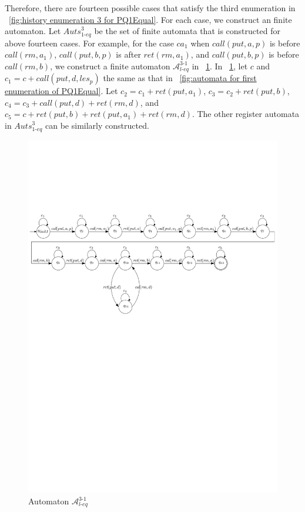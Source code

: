 Therefore, there are fourteen possible cases that satisfy the third enumeration in \figurename~\ref{fig:history enumeration 3 for PQ1Equal}. For each case, we construct an finite automaton. Let $\textit{Auts}_{\textit{1-eq}}^{3}$ be the set of finite automata that is constructed for above fourteen cases. For example, for the case $\textit{ca}_1$ when $\textit{call}(\textit{put},a,p)$ is before $\textit{call}(\textit{rm},a_1)$, $\textit{call}(\textit{put},b,p)$ is after $\textit{ret}(\textit{rm},a_1)$, and $\textit{call}(\textit{put},b,p)$ is before $\textit{call}(\textit{rm},b)$, we construct a finite automaton $\mathcal{A}_{\textit{l-eq}}^{\textit{3-1}}$ in \figurename~\ref{fig:automata for ca1 of third enumeration of Rpr2}. In \figurename~\ref{fig:automata for ca1 of third enumeration of Rpr2}, let $c$ and $c_1 = c + \textit{call}(\textit{put},d,\textit{les}_p)$ the same as that in \figurename~\ref{fig:automata for first enumeration of PQ1Equal}. Let $c_2 = c_1 + \textit{ret}(\textit{put},a_1)$, $c_3 = c_2 + \textit{ret}(\textit{put},b)$, $c_4 = c_3 + \textit{call}(\textit{put},d) + \textit{ret}(\textit{rm},d)$, and $c_5 = c + \textit{ret}(\textit{put},b) + \textit{ret}(\textit{put},a_1) + \textit{ret}(\textit{rm},d)$. The other register automata in $\textit{Auts}_{\textit{1-eq}}^{3}$ can be similarly constructed.

\begin{figure}[htbp]
  \centering
  \includegraphics[width=0.8 \textwidth]{figures/PIC_AUTO_PQ1Equ-3-1.pdf}
  \caption{Automaton $\mathcal{A}_{\textit{l-eq}}^{\textit{3-1}}$}
  \label{fig:automata for ca1 of third enumeration of Rpr2}
\end{figure}

